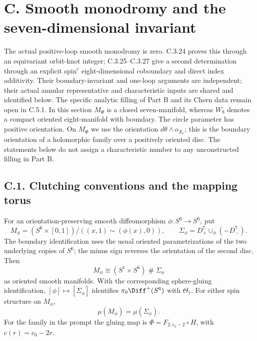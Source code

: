 \section{C. Smooth monodromy and the seven-dimensional invariant}

The actual positive-loop smooth monodromy is zero. C.3.24 proves
this through an equivariant orbit-knot integer; C.3.25--C.3.27
give a second determination through an explicit spin$^c$
eight-dimensional coboundary and direct index additivity. Their
boundary-invariant and one-loop arguments are independent; their
actual annular representative and characteristic inputs are shared
and identified below. The specific analytic filling of Part B and
its Chern data remain open in C.5.1. In this section $M_\Phi$ is a closed seven-manifold, whereas $W_8$ denotes a
compact oriented eight-manifold with boundary. The circle parameter
has positive orientation. On $M_\Phi$ we use the orientation
$d\theta\wedge o_{X_c}$; this is the boundary orientation of a
holomorphic family over a positively oriented disc. The statements
below do not assign a characteristic number to any unconstructed
filling in Part B.

\subsection{C.1. Clutching conventions and the mapping torus}

\begin{proposition}
For an orientation-preserving smooth diffeomorphism
$\phi:S^6\to S^6$, put
\[
 M_\phi=(S^6\times[0,1])/((x,1)\sim(\phi(x),0)),\qquad
 \Sigma_\phi=D^7_+\cup_\phi(-D^7_-).
\]
The boundary identification uses the usual oriented parametrizations
of the two underlying copies of $S^6$; the minus sign reverses the
orientation of the second disc. Then
\[
 M_\phi\cong (S^1\times S^6)\mathbin\#\Sigma_\phi
\]
as oriented smooth manifolds. With the corresponding sphere-gluing
identification, $[\phi]\mapsto[\Sigma_\phi]$ identifies
$\pi_0\Diff^+(S^6)$ with $\Theta_7$. For either spin structure on
$M_\phi$,
\[
 \mu(M_\phi)=\mu(\Sigma_\phi).
\]
For the family in the prompt the gluing map is
$\Phi=F_{2,c_0-2}\circ H$, with $c(r)=c_0-2r$.
\end{proposition}

